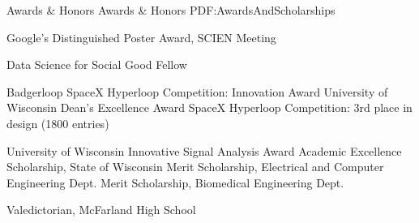 \Section
{Awards \&\newline
Honors}
{Awards \& Honors}
{PDF:AwardsAndScholarships}

\Gap
\BulletItem
Google's Distinguished Poster Award, SCIEN Meeting 
\hfill {}

\Gap
\BulletItem Data Science for Social Good Fellow 
\hfill {}

\Gap
\BulletItem Badgerloop
\hfill
{}
\SubBulletItem SpaceX Hyperloop Competition: Innovation Award
\SubBulletItem University of Wisconsin Dean's Excellence Award 
\SubBulletItem SpaceX Hyperloop Competition: 3rd place in design (1800 entries) 

\Gap
\BulletItem University of Wisconsin
\hfill {}
\SubBulletItem Innovative Signal Analysis Award
\SubBulletItem Academic Excellence Scholarship, State of Wisconsin
\SubBulletItem Merit Scholarship, Electrical and Computer Engineering Dept.
\SubBulletItem Merit Scholarship, Biomedical Engineering Dept.

\Gap 
\BulletItem Valedictorian, McFarland High School 
\hfill {}

